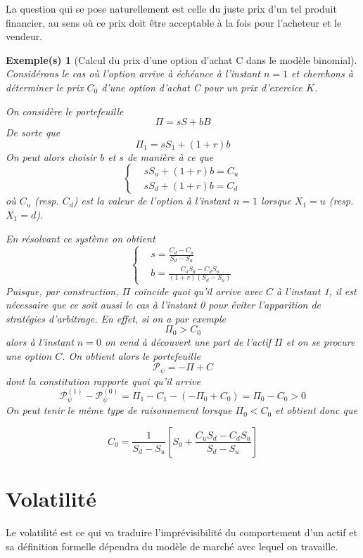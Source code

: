 \documentclass[a4paper]{book}
\newtheorem{ex}{Exemple(s)}[chapter]
\begin{document}
La question qui se pose naturellement est celle du juste prix d'un tel produit financier, au sens où ce prix doit être acceptable à la fois pour l'acheteur et le vendeur.
\begin{ex}[Calcul du prix d'une option d'achat C dans le modèle binomial]

    Considérons le cas où l'option arrive à échéance à l'instant $n=1$ et cherchons à déterminer le prix $C_0$ d'une option d'achat C pour un prix d'exercice $K$.

    On considère le portefeuille
    \[\Pi = sS+bB \]
    De sorte que
    \[\Pi_1=sS_1+(1+r)b \]
    On peut alors choisir $b$ et $s$ de manière à ce que
    \[\left\lbrace\begin{aligned}
             & sS_u+(1+r)b=C_u \\
             & sS_d+(1+r)b=C_d
        \end{aligned}\right. \]
    où $C_u$ (resp. $C_d$) est la valeur de l'option à l'instant $n=1$ lorsque $X_1=u$ (resp. $X_1=d$).

    En résolvant ce système on obtient
    \[\left\lbrace\begin{aligned}
             & s=\frac{C_d-C_u}{S_d-S_u}              \\
             & b=\frac{C_uS_d-C_dS_u}{(1+r)(S_d-S_u)}
        \end{aligned}\right. \]
    Puisque, par construction, $\Pi$ coïncide quoi qu'il arrive avec $C$ à l'instant 1, il est nécessaire que ce soit aussi le cas à l'instant 0 pour éviter l'apparition de stratégies d'arbitrage. En effet, si on a par exemple
    \[\Pi_0>C_0 \]
    alors à l'instant $n=0$ on vend à découvert une part de l'actif $\Pi$ et on se procure une option $C$. On obtient alors le portefeuille
    \[\mathcal{P}_{\psi}=-\Pi+C \]
    dont la constitution rapporte quoi qu'il arrive
    \[\mathcal{P}_{\psi}^{(1)}-\mathcal{P}_{\psi}^{(0)}=\Pi_1-C_1-(-\Pi_0+C_0)=\Pi_0-C_0>0 \]
    On peut tenir le même type de raisonnement lorsque $\Pi_0<C_0$ et obtient donc que

    \[C_0=\frac{1}{S_d-S_u}\left[S_0+ \frac{C_uS_d-C_dS_u}{S_d-S_u} \right] \]
\end{ex}

\section{Volatilité}
Le volatilité est ce qui va traduire l'imprévisibilité du comportement d'un actif et sa définition formelle dépendra du modèle de marché avec lequel on travaille.
\end{document}
